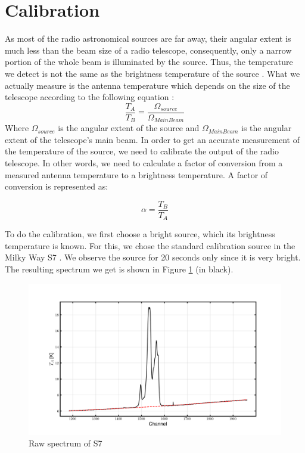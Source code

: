\documentclass[12pt]{article}
\begin{document}
\section{Calibration}
As most of the radio astronomical sources are far away, their angular extent is much less than the beam size of a radio telescope, consequently, only a narrow portion of the whole beam is illuminated by the source. Thus, the temperature we detect is not the same as the brightness temperature of the source \cite{lecturenote}. What we actually measure is the antenna temperature which depends on the size of the telescope according to the following equation \cite{klein}:
\begin{equation}
    \frac{T_A}{T_B} = \frac{\Omega_{source}} {\Omega_{MainBeam}}
\end{equation}
Where $\Omega_{source}$ is the angular extent of the source and $\Omega_{MainBeam}$ is the angular extent of the telescope's main beam. 
In order to get an accurate measurement of the temperature of the source, we need to calibrate the output of the radio telescope. In other words, we need to calculate a factor of conversion from a measured antenna temperature to a brightness temperature. A factor of conversion is represented as:

\begin{equation}
    \alpha = \frac{T_B}{T_A}
\end{equation}

To do the calibration, we first choose a bright source, which its brightness temperature is known. For this, we chose the standard calibration source in the Milky Way S7 \cite{calibration}. We observe the source for 20 seconds only since it is very bright. The resulting spectrum we get is shown in Figure \ref{fig3.1} (in black).

\begin{figure}[H]
    \centering
    \includegraphics[width = \textwidth]{fig/calibration.png}
    \caption{Raw spectrum of S7}
    \label{fig3.1}
\end{figure}
\end{document}
